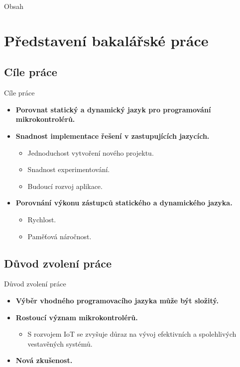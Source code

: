 \documentclass{beamer}
\title{\thesisname}
\author{\authorname}
\institute{Univerzita Palackého v Olomouci}
\date{\today}
\begin{document}
\begin{frame}
	\titlepage
\end{frame}

\begin{frame}{Obsah}
	\tableofcontents
\end{frame}

\section{Představení bakalářské práce}
\subsection{Cíle práce}
\begin{frame}{Cíle práce}
	\begin{itemize}
		\item \textbf{Porovnat statický a dynamický jazyk pro programování mikrokontrolérů.}
		\item \textbf{Snadnost implementace řešení v zastupujících jazycích.}
			\begin{itemize}
				\item[\textendash] Jednoduchost vytvoření nového projektu.
				\item[\textendash] Snadnost experimentování.
				\item[\textendash] Budoucí rozvoj aplikace.
			\end{itemize}
		\item \textbf{Porovnání výkonu zástupců statického a dynamického jazyka.}
			\begin{itemize}
				\item[\textendash] Rychlost.
				\item[\textendash] Paměťová náročnost.
			\end{itemize}
	\end{itemize}
\end{frame}

\subsection{Důvod zvolení práce}
\begin{frame}{Důvod zvolení práce}
	\begin{itemize}
		\item \textbf{Výběr vhodného programovacího jazyka může být složitý.}
		\item \textbf{Rostoucí význam mikrokontrolérů.}
			\begin{itemize}
				\item[\textendash] S rozvojem IoT se zvyšuje důraz na vývoj efektivních a spolehlivých vestavěných systémů.
			\end{itemize}
		\item \textbf{Nová zkušenost.}
	\end{itemize}

\end{frame}
\end{document}

